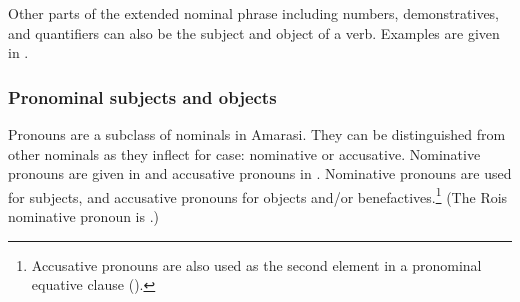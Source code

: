 \begin{exe}
		\label{ex:120715-4, 0.45}
	\label{ex:140726, 0.00}
\end{exe}

Other parts of the extended nominal phrase including numbers,
demonstratives, and quantifiers can also be the subject and object of a verb.
Examples are given in .

\subsubsection{Pronominal subjects and objects}\label{sec:ProArg}
Pronouns are a subclass of nominals in Amarasi.
They can be distinguished from other nominals
as they inflect for case: nominative or accusative.
Nominative pronouns are given in 
and accusative pronouns in .
Nominative pronouns are used for subjects,
and accusative pronouns for objects and/or benefactives.\footnote{
		Accusative pronouns are also used as the second element in 
		a pronominal equative clause ().}
(The Ro{\Q}is  nominative pronoun is .)

